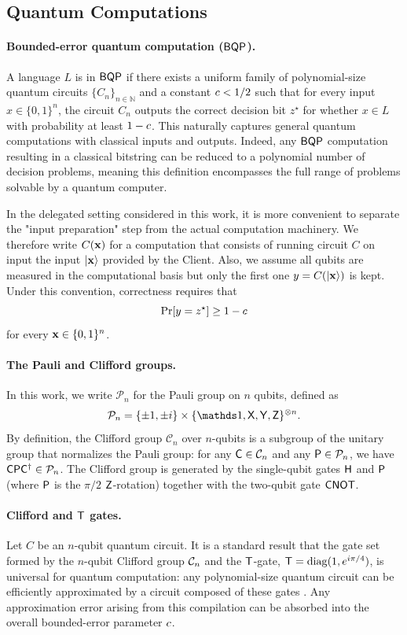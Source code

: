 \subsection{Quantum Computations}
\label{subsection:prelims:QC}

\paragraph{Bounded-error quantum computation ($\BQP$).}
A language $L$ is in $\BQP$ if there exists a uniform family of polynomial-size quantum circuits $\{C_n\}_{n \in \mathbb{N}}$ and a constant $\bqp < 1/2$ such that for every input $x \in \{0,1\}^n$, the circuit $C_n$ outputs the correct decision bit $z^\star$ for whether $x \in L$ with probability at least $1-\bqp$. This naturally captures general quantum computations with classical inputs and outputs.
Indeed, any $\BQP$ computation resulting in a classical bitstring can be reduced to a polynomial number of decision problems, meaning this definition encompasses the full range of problems solvable by a quantum computer.

In the delegated setting considered in this work, it is more convenient to separate the "input preparation" step from the actual computation machinery. We therefore write $C(\x)$ for a computation that consists of running circuit $C$ on input the input $\ket\x$ provided by the Client. Also, we assume all qubits are measured in the computational basis but only the first one $y=C(\ket\x)$ is kept. Under this convention, correctness requires that
\[
\Pr[y = z^\star] \geq 1-\bqp
\]
for every $\x \in \{0,1\}^n$.

\paragraph{The Pauli and Clifford groups.}
In this work, we write $\mathcal P_n$ for the Pauli group on $n$ qubits, defined as
\[
\mathcal P_n=\{\pm 1,\pm i\}\times \{\id,\X,\Y,\Z\}^{\otimes n}.
\]
By definition, the Clifford group $\mathcal{C}_n$ over $n$-qubits is a subgroup of the unitary group that normalizes the Pauli group: for any $\C\in\Clifford_n$ and any $\P\in\Pauli_n$, we have $\C\P\C^\dagger\in\Pauli_n$. The Clifford group is generated by the single-qubit gates $\H$ and $\P$ (where $\P$ is the $\pi/2$ $\Z$-rotation) together with the two-qubit gate $\CNOT$.

\paragraph{Clifford and $\T$ gates.}
Let $C$ be an $n$-qubit quantum circuit. It is a standard result that the gate set formed by the $n$-qubit Clifford group $\Clifford_n$ and the $\T$-gate, $\T = \mathrm{diag}(1, e^{i\pi/4})$, is universal for quantum computation: any polynomial-size quantum circuit can be efficiently approximated by a circuit composed of these gates \cite{NC00quantum}. Any approximation error arising from this compilation can be absorbed into the overall bounded-error parameter $\bqp$.


